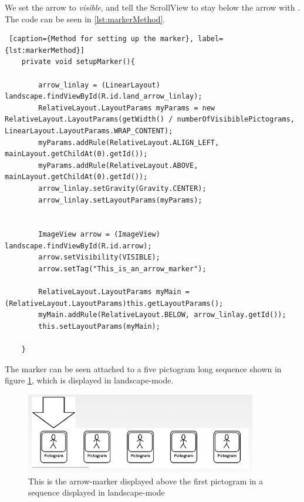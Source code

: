 We set the arrow to \textit{visible}, and tell the ScrollView to stay below the arrow with . The code can be seen in \ref{lst:markerMethod}.

\begin{lstlisting} [caption={Method for setting up the marker}, label={lst:markerMethod}]
    private void setupMarker(){

        arrow_linlay = (LinearLayout) landscape.findViewById(R.id.land_arrow_linlay);
        RelativeLayout.LayoutParams myParams = new RelativeLayout.LayoutParams(getWidth() / numberOfVisibiblePictograms, LinearLayout.LayoutParams.WRAP_CONTENT);
        myParams.addRule(RelativeLayout.ALIGN_LEFT, mainLayout.getChildAt(0).getId());
        myParams.addRule(RelativeLayout.ABOVE, mainLayout.getChildAt(0).getId());
        arrow_linlay.setGravity(Gravity.CENTER);
        arrow_linlay.setLayoutParams(myParams);


        ImageView arrow = (ImageView) landscape.findViewById(R.id.arrow);
        arrow.setVisibility(VISIBLE);
        arrow.setTag("This_is_an_arrow_marker");

        RelativeLayout.LayoutParams myMain = (RelativeLayout.LayoutParams)this.getLayoutParams();
        myMain.addRule(RelativeLayout.BELOW, arrow_linlay.getId());
        this.setLayoutParams(myMain);

    }
\end{lstlisting}

The marker can be seen attached to a five pictogram long sequence shown in figure \ref{fig:markerpic}, which is displayed in landscape-mode.
\begin{figure} [h!]
\centering
\includegraphics[width=0.9\textwidth]{Pics/Sprint3/landscape5picsCROP.png}
\caption{This is the arrow-marker displayed above the first pictogram in a sequence displayed in landscape-mode}
\label{fig:markerpic}
\end{figure}